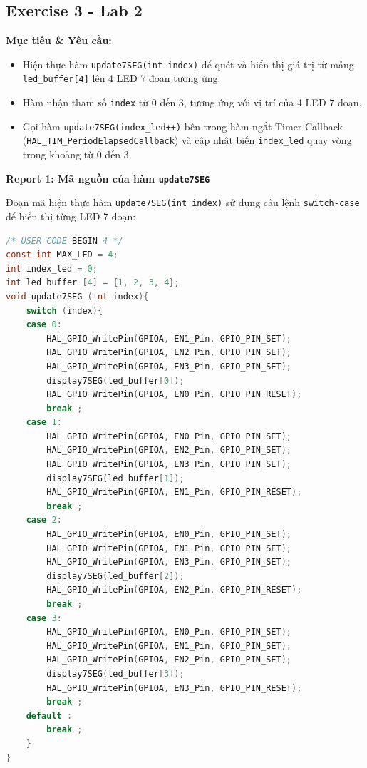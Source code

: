 \subsection{Exercise 3 - Lab 2}

\textbf{Mục tiêu \& Yêu cầu:}
\begin{itemize}
    \item Hiện thực hàm \texttt{update7SEG(int index)} để quét và hiển thị giá trị từ mảng \texttt{led\_buffer[4]} lên 4 LED 7 đoạn tương ứng.
    \item Hàm nhận tham số \texttt{index} từ $0$ đến $3$, tương ứng với vị trí của 4 LED 7 đoạn.
    \item Gọi hàm \texttt{update7SEG(index\_led++)} bên trong hàm ngắt Timer Callback (\texttt{HAL\_TIM\_PeriodElapsedCallback}) và cập nhật biến \texttt{index\_led} quay vòng trong khoảng từ $0$ đến $3$.
\end{itemize}

\vspace{0.3cm}

\textbf{Report 1: Mã nguồn của hàm \texttt{update7SEG}}

Đoạn mã hiện thực hàm \texttt{update7SEG(int index)} sử dụng câu lệnh \texttt{switch-case} để hiển thị từng LED 7 đoạn:

\begin{lstlisting}[language=C, caption={Hàm update7SEG hiển thị dữ liệu từ led\_buffer}, label={lst:lab2_ex3_update7seg}]
/* USER CODE BEGIN 4 */
const int MAX_LED = 4;
int index_led = 0;
int led_buffer [4] = {1, 2, 3, 4};
void update7SEG (int index){
    switch (index){
    case 0:
        HAL_GPIO_WritePin(GPIOA, EN1_Pin, GPIO_PIN_SET);
        HAL_GPIO_WritePin(GPIOA, EN2_Pin, GPIO_PIN_SET);
        HAL_GPIO_WritePin(GPIOA, EN3_Pin, GPIO_PIN_SET);
        display7SEG(led_buffer[0]);
        HAL_GPIO_WritePin(GPIOA, EN0_Pin, GPIO_PIN_RESET);
        break ;
    case 1:
        HAL_GPIO_WritePin(GPIOA, EN0_Pin, GPIO_PIN_SET);
        HAL_GPIO_WritePin(GPIOA, EN2_Pin, GPIO_PIN_SET);
        HAL_GPIO_WritePin(GPIOA, EN3_Pin, GPIO_PIN_SET);
        display7SEG(led_buffer[1]);
        HAL_GPIO_WritePin(GPIOA, EN1_Pin, GPIO_PIN_RESET);
        break ;
    case 2:
        HAL_GPIO_WritePin(GPIOA, EN0_Pin, GPIO_PIN_SET);
        HAL_GPIO_WritePin(GPIOA, EN1_Pin, GPIO_PIN_SET);
        HAL_GPIO_WritePin(GPIOA, EN3_Pin, GPIO_PIN_SET);
        display7SEG(led_buffer[2]);
        HAL_GPIO_WritePin(GPIOA, EN2_Pin, GPIO_PIN_RESET);
        break ;
    case 3:
        HAL_GPIO_WritePin(GPIOA, EN0_Pin, GPIO_PIN_SET);
        HAL_GPIO_WritePin(GPIOA, EN1_Pin, GPIO_PIN_SET);
        HAL_GPIO_WritePin(GPIOA, EN2_Pin, GPIO_PIN_SET);
        display7SEG(led_buffer[3]);
        HAL_GPIO_WritePin(GPIOA, EN3_Pin, GPIO_PIN_RESET);
        break ;
    default :
        break ;
    }
}
\end{lstlisting}


